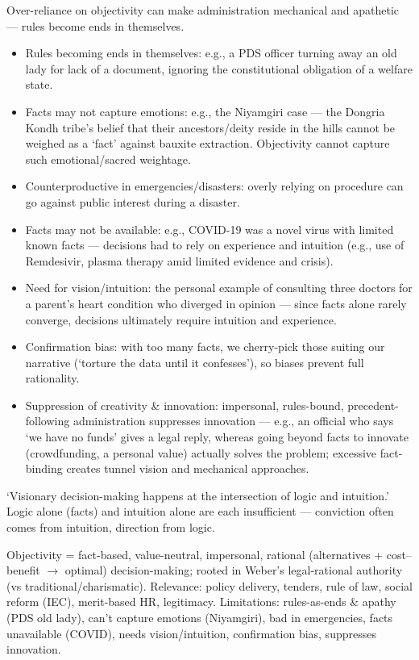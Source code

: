 Over-reliance on objectivity can make administration mechanical and apathetic --- rules become ends in themselves.

\begin{itemize}
\item Rules becoming ends in themselves: e.g., a PDS officer turning away an old lady for lack of a document, ignoring the constitutional obligation of a welfare state.
\item Facts may not capture emotions: e.g., the Niyamgiri case --- the Dongria Kondh tribe's belief that their ancestors/deity reside in the hills cannot be weighed as a `fact' against bauxite extraction. Objectivity cannot capture such emotional/sacred weightage.
\item Counterproductive in emergencies/disasters: overly relying on procedure can go against public interest during a disaster.
\item Facts may not be available: e.g., COVID-19 was a novel virus with limited known facts --- decisions had to rely on experience and intuition (e.g., use of Remdesivir, plasma therapy amid limited evidence and crisis).
\item Need for vision/intuition: the personal example of consulting three doctors for a parent's heart condition who diverged in opinion --- since facts alone rarely converge, decisions ultimately require intuition and experience.
\item Confirmation bias: with too many facts, we cherry-pick those suiting our narrative (`torture the data until it confesses'), so biases prevent full rationality.
\item Suppression of creativity \& innovation: impersonal, rules-bound, precedent-following administration suppresses innovation --- e.g., an official who says `we have no funds' gives a legal reply, whereas going beyond facts to innovate (crowdfunding, a personal value) actually solves the problem; excessive fact-binding creates tunnel vision and mechanical approaches.
\end{itemize}

\begin{PYQLink}
`Visionary decision-making happens at the intersection of logic and intuition.' Logic alone (facts) and intuition alone are each insufficient --- conviction often comes from intuition, direction from logic.
\end{PYQLink}

\begin{QuickRevision}
Objectivity = fact-based, value-neutral, impersonal, rational (alternatives + cost--benefit $\rightarrow$ optimal) decision-making; rooted in Weber's legal-rational authority (vs traditional/charismatic). Relevance: policy delivery, tenders, rule of law, social reform (IEC), merit-based HR, legitimacy. Limitations: rules-as-ends \& apathy (PDS old lady), can't capture emotions (Niyamgiri), bad in emergencies, facts unavailable (COVID), needs vision/intuition, confirmation bias, suppresses innovation.
\end{QuickRevision}


